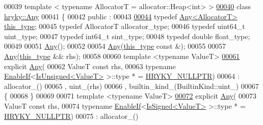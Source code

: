 \begin{DoxyCode}
00039 \textcolor{comment}{}\textcolor{keyword}{template} < \textcolor{keyword}{typename} AllocatorT = allocator::Heap<\textcolor{keywordtype}{int}> >
\hypertarget{any_8h_source_l00040}{}\hyperlink{classhryky_1_1_any}{00040} \textcolor{keyword}{class }\hyperlink{classhryky_1_1_any}{hryky::Any}
00041 \{
00042 \textcolor{keyword}{public} :
00043 
\hypertarget{any_8h_source_l00044}{}\hyperlink{classhryky_1_1_any_accb3d649460111ed6f04293f3e5865bc}{00044}     \textcolor{keyword}{typedef} \hyperlink{classhryky_1_1_any}{Any<AllocatorT>} \hyperlink{classhryky_1_1_any_accb3d649460111ed6f04293f3e5865bc}{this_type};
00045     \textcolor{keyword}{typedef} AllocatorT allocator\_type;
00046     \textcolor{keyword}{typedef} uint64\_t uint\_type;
00047     \textcolor{keyword}{typedef} int64\_t sint\_type;
00048     \textcolor{keyword}{typedef} \textcolor{keywordtype}{double} float\_type;
00049 
00051     \hyperlink{classhryky_1_1_any_a3d0d9135c798b3bfb4428fc04f168414}{Any}();
00052 
00054     \hyperlink{classhryky_1_1_any_a3d0d9135c798b3bfb4428fc04f168414}{Any}(\hyperlink{classhryky_1_1_any}{this_type} \textcolor{keyword}{const} &);
00055 
00057     \hyperlink{classhryky_1_1_any_a3d0d9135c798b3bfb4428fc04f168414}{Any}(\hyperlink{classhryky_1_1_any}{this_type} && rhs);
00058 
00060     \textcolor{keyword}{template} <\textcolor{keyword}{typename} ValueT>
\hypertarget{any_8h_source_l00061}{}\hyperlink{classhryky_1_1_any_a29310c8ac9eb7914a68da33ac430ba9f}{00061}     \textcolor{keyword}{explicit} \hyperlink{classhryky_1_1_any_a3d0d9135c798b3bfb4428fc04f168414}{Any}(
00062         ValueT \textcolor{keyword}{const} rhs,
00063         \textcolor{keyword}{typename} \hyperlink{classhryky_1_1_enable_if}{EnableIf}<\hyperlink{classhryky_1_1_is_unsigned}{IsUnsigned<ValueT>} >::type * = \hyperlink{common_8h_a4cd4ac09cfcdbd6b30ee69afc156e210}{HRYKY_NULLPTR})
00064         : allocator\_()
00065           , uint\_(rhs)
00066           , builtin\_kind\_(BuiltinKind::uint\_)
00067     \{
00068     \}
00069 
00071     \textcolor{keyword}{template} <\textcolor{keyword}{typename} ValueT>
\hypertarget{any_8h_source_l00072}{}\hyperlink{classhryky_1_1_any_a4e101053b5c51d90939b458f7243a420}{00072}     \textcolor{keyword}{explicit} \hyperlink{classhryky_1_1_any_a3d0d9135c798b3bfb4428fc04f168414}{Any}(
00073         ValueT \textcolor{keyword}{const} rhs,
00074         \textcolor{keyword}{typename} \hyperlink{classhryky_1_1_enable_if}{EnableIf}<\hyperlink{classhryky_1_1_is_signed}{IsSigned<ValueT>} >::type * = \hyperlink{common_8h_a4cd4ac09cfcdbd6b30ee69afc156e210}{HRYKY_NULLPTR})
00075         : allocator\_()

\end{DoxyCode}
